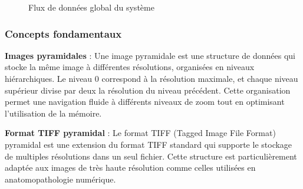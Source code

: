 \documentclass[12pt,a4paper]{report}
\begin{document}
\begin{}
\begin{}
\begin{}
\begin{}
\begin{figure}[H]
\caption{Flux de données global du système}
\end{figure}

\subsubsection{Concepts fondamentaux}

\textbf{Images pyramidales} : Une image pyramidale est une structure de données qui stocke la même image à différentes résolutions, organisées en niveaux hiérarchiques. Le niveau 0 correspond à la résolution maximale, et chaque niveau supérieur divise par deux la résolution du niveau précédent. Cette organisation permet une navigation fluide à différents niveaux de zoom tout en optimisant l'utilisation de la mémoire.

\textbf{Format TIFF pyramidal} : Le format TIFF (Tagged Image File Format) pyramidal est une extension du format TIFF standard qui supporte le stockage de multiples résolutions dans un seul fichier. Cette structure est particulièrement adaptée aux images de très haute résolution comme celles utilisées en anatomopathologie numérique.


\end{}
\end{}
\end{}
\end{}
\end{document}

